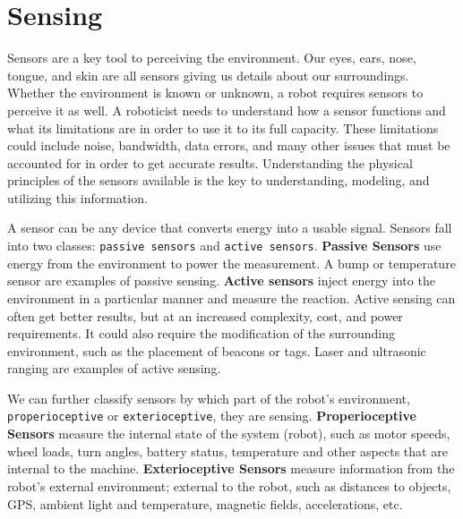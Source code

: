 \hypertarget{sensing}{%
\section{Sensing}\label{sensing}}

Sensors are a key tool to perceiving the environment. Our eyes, ears,
nose, tongue, and skin are all sensors giving us details about our
surroundings. Whether the environment is known or unknown, a robot
requires sensors to perceive it as well. A roboticist needs to
understand how a sensor functions and what its limitations are in order
to use it to its full capacity. These limitations could include noise,
bandwidth, data errors, and many other issues that must be accounted for
in order to get accurate results. Understanding the physical principles
of the sensors available is the key to understanding, modeling, and
utilizing this information.

A sensor can be any device that converts energy into a usable signal.
Sensors fall into two classes: \texttt{passive\ sensors} and
\texttt{active\ sensors}. \textbf{Passive Sensors} use energy from the
environment to power the measurement. A bump or temperature sensor are
examples of passive sensing. \textbf{Active sensors} inject energy into
the environment in a particular manner and measure the reaction. Active
sensing can often get better results, but at an increased complexity,
cost, and power requirements. It could also require the modification of
the surrounding environment, such as the placement of beacons or tags.
Laser and ultrasonic ranging are examples of active sensing.

We can further classify sensors by which part of the robot's
environment, \texttt{properioceptive} or \texttt{exterioceptive}, they
are sensing. \textbf{Properioceptive Sensors} measure the internal state
of the system (robot), such as motor speeds, wheel loads, turn angles,
battery status, temperature and other aspects that are internal to the
machine. \textbf{Exterioceptive Sensors} measure information from the
robot's external environment; external to the robot, such as distances
to objects, GPS, ambient light and temperature, magnetic fields,
accelerations, etc.

